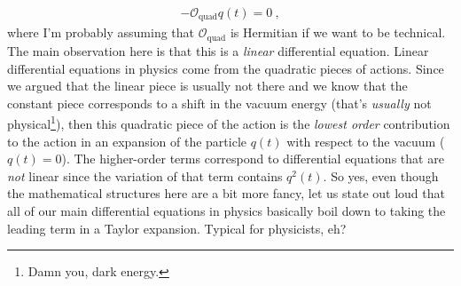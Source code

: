\begin{align}
	-\mathcal O_\text{quad} q(t) = 0 \ ,
\end{align}
where I'm probably assuming that $\mathcal O_\text{quad}$ is Hermitian if we want to be technical. The main observation here is that this is a \emph{linear} differential equation. Linear differential equations in physics come from the quadratic pieces of actions. Since we argued that the linear piece is usually not there and we know that the constant piece corresponds to a shift in the vacuum energy (that's \emph{usually} not physical\footnote{Damn you, dark energy.}), then this quadratic piece of the action is the \emph{lowest order} contribution to the action in an expansion of the particle $q(t)$ with respect to the vacuum ($q(t)=0$). The higher-order terms correspond to differential equations that are \emph{not} linear since the variation of that term contains $q^2(t)$. So yes, even though the mathematical structures here are a bit more fancy, let us state out loud that all of our main differential equations in physics basically boil down to taking the leading term in a Taylor expansion. Typical for physicists, eh?
